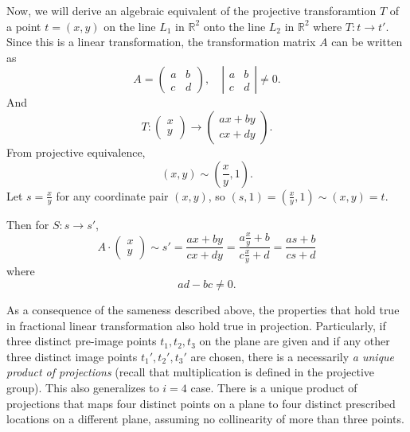 Now, we will derive an algebraic equivalent of the projective transforamtion $T$ of a point $t = (x,y)$ on the line $L_{1}$ in $\mathbb{R}^{2} $ onto the line $L_{2} $ in $\mathbb{R}^{2}$ where $T: t \rightarrow t' $. 
Since this is a linear transformation, the transformation matrix $A$ can be written as \[A = \left(\begin{array}{cc}a & b \\c & d\end{array}\right),\quad \left|\begin{array}{cc}a & b \\c & d\end{array}\right|\neq 0.\] And \[ T: \left(\begin{array}{c}x \\y\end{array}\right) \rightarrow \left(\begin{array}{c}ax +by \\cx+ dy\end{array}\right).\]
From projective equivalence, \[ (x,y) \sim (\frac{x}{y}, 1).\]
Let $s = \frac{x}{y}$ for any coordinate pair $(x,y)$, so $(s,1) = ( \frac{x}{y},1) \sim (x,y) = t$. 

Then for $ S: s \rightarrow s' $, \[ A\cdot\left(\begin{array}{c}x \\y\end{array}\right) \sim s' = \frac{ax+by}{cx+dy} = \frac{a\frac{x}{y}+b}{c\frac{x}{y}+d} = \frac{as+b}{cs+d}\]
where
\[ ad-bc \neq0.\]

As a consequence of the sameness described above, the properties that hold true in fractional linear transformation also hold true in projection. Particularly, if three distinct pre-image points $t_{1}, t_{2}, t_{3}$ on the plane are given and if any other three distinct image points $t_{1}', t_{2}', t_{3}'$ are chosen, there is a necessarily \emph{a unique product of projections} (recall that multiplication is defined in the projective group). This also generalizes to $i = 4$ case. There is a unique product of projections that maps four distinct points on a plane to four distinct prescribed locations on a different plane, assuming no collinearity of more than three points. 


